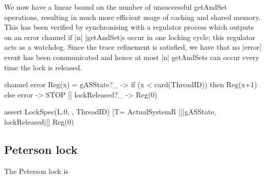 We now have a linear bound on the number of unsuccessful getAndSet operations, resulting in much more efficient usage of caching and shared memory. This has been verified by synchronising with a regulator process which outputs on an error channel if |n| |getAndSet|s occur in one locking cycle; this regulator acts as a watchdog. Since the trace refinement is satisfied, we have that no |error| event has been communicated and hence at most |n| getAndSets can occur every time the lock is released. 

\begin{cspm}
channel error
Reg(x) =    gASState?_ -> if (x < card(ThreadID)) then Reg(x+1)
                          else error -> STOP
         [] lockReleased?_ -> Reg(0)

assert LockSpec(L.0, {}, ThreadID) 
         [T= ActualSystemR [|{|gASState, lockReleased|}|] Reg(0)
\end{cspm}

\subsection{Peterson lock}

The Peterson lock is 






